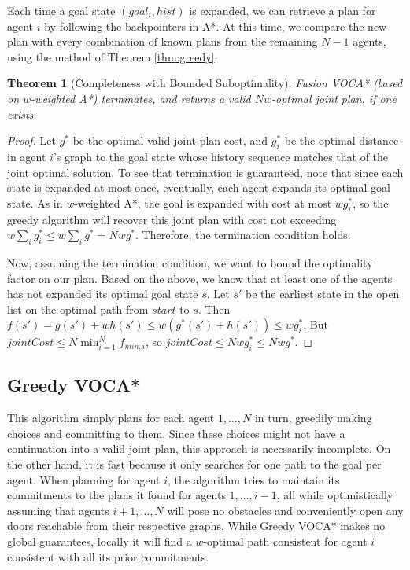 \documentclass[letterpaper]{article}
\newtheorem{thm}{Theorem}
\begin{document}
Each time a goal state $(goal_i, hist)$ is expanded, we can retrieve a plan for agent $i$ by following the backpointers in A*. At this time, we compare the new plan with every combination of known plans from the remaining $N-1$ agents, using the method of Theorem \ref{thm:greedy}.

\begin{thm}[Completeness with Bounded Suboptimality]
\label{thm:complete}
Fusion VOCA* (based on $w$-weighted A*) terminates, and returns a valid $Nw$-optimal joint plan, if one exists.
\end{thm}

\begin{proof}
Let $g^*$ be the optimal valid joint plan cost, and $g_i^*$ be the optimal distance in agent $i$'s graph to the goal state whose history sequence matches that of the joint optimal solution. To see that termination is guaranteed, note that since each state is expanded at most once, eventually, each agent expands its optimal goal state. As in $w$-weighted A*, the goal is expanded with cost at most $w g_i^*$, so the greedy algorithm will recover this joint plan with cost not exceeding $w \sum_i g_i^* \le w \sum_i g^* = Nw g^*$. Therefore, the termination condition holds.

Now, assuming the termination condition, we want to bound the optimality factor on our plan. Based on the above, we know that at least one of the agents has not expanded its optimal goal state $s$. Let $s'$ be the earliest state in the open list on the optimal path from $start$ to $s$. Then $f(s') = g(s') + wh(s') \le w(g^*(s') + h(s')) \le w g_i^*$. But $jointCost \le N \min_{i=1}^N f_{min,i}$, so $jointCost \le Nw g_i^* \le Nw g^*$.
\end{proof}

\subsection{Greedy VOCA*}

This algorithm simply plans for each agent $1,\ldots,N$ in turn, greedily making choices and committing to them. Since these choices might not have a continuation into a valid joint plan, this approach is necessarily incomplete. On the other hand, it is fast because it only searches for one path to the goal per agent. When planning for agent $i$, the algorithm tries to maintain its commitments to the plans it found for agents $1,
\ldots,i-1$, all while optimistically assuming that agents $i+1,\ldots,N$ will pose no obstacles and conveniently open any doors reachable from their respective graphs. While Greedy VOCA* makes no global guarantees, locally it will find a $w$-optimal path consistent for agent $i$ consistent with all its prior commitments.
\end{document}
